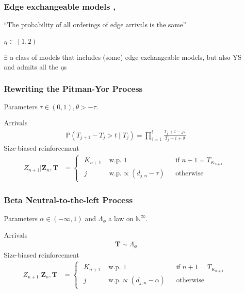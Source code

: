 \documentclass[final,hyperref={pdfpagelabels=false},noamsthm]{beamer}
\def\bbP{\mathbb{P}}
\newcommand{\ee}{Z} %
\newcommand{\bfee}{\mathbf{\ee}}
\newcommand{\bfT}{\mathbf{T}}
\begin{document}
\begin{frame}
	\frametitle{Edge exchangeable models \cite{cai2016}, \cite{CraneDempsey2017}}
	``The probability of all orderings of edge arrivals is the same''
	
	\vspace{20pt}
	
	$\eta \in (1,2)$
	
	$\exists$ a class of models that includes (some) edge exchangeable models, but also YS and admits all the $\eta$s
	
\end{frame}

\begin{frame}
	\frametitle{Rewriting the Pitman-Yor Process}
	Parameters $\tau \in (0, 1), \theta > -\tau$.
	\vspace{15pt}
	
	Arrivals
	\begin{align}
	\bbP(T_{j+1} - T_j > t \mid T_j) = \prod_{i=1}^{t} \frac{T_j + t - j \tau}{T_j + t + \theta}
	\end{align}
	Size-biased reinforcement
	\begin{align} 
	\ee_{n+1} | \bfee_{n}, \bfT &= \begin{cases}\begin{aligned}
	K_{n+1} & \text{ w.p. } 1 && \text{if } n+1 = T_{K_{n+1}} \\
	j &\text{ w.p.} \propto (d_{j,n} - \tau) && \text{otherwise} 
	\end{aligned}\end{cases}
	\label{eq:pyp}
	\end{align}
\end{frame}

\begin{frame}
	\frametitle{Beta Neutral-to-the-left Process \cite{Bloem2017}}
	Parameters $\alpha \in (-\infty, 1)$ and $\Lambda_\phi$ a law on $\mathbb{N}^\infty$.
	\vspace{15pt}
	
	Arrivals
	\begin{align}
	\bfT \sim \Lambda_\phi
	\end{align}
	Size-biased reinforcement
	\begin{align} 
	\ee_{n+1} | \bfee_{n}, \bfT &= \begin{cases}\begin{aligned}
	K_{n+1} & \text{ w.p. } 1 && \text{if } n+1 = T_{K_{n+1}} \\
	j &\text{ w.p.} \propto (d_{j,n} - \alpha) && \text{otherwise} 
	\end{aligned}\end{cases}
	\label{eq:bntl}
	\end{align}
\end{frame}
\end{document}
